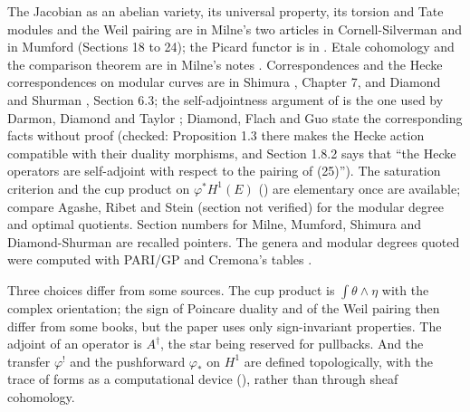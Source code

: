 The Jacobian as an abelian variety, its universal property, its torsion and Tate modules and the Weil pairing are in Milne's two articles in Cornell-Silverman
\cite{MilneJacobian86,MilneAbelian86} and in Mumford \cite{Mumford70} (Sections 18 to 24); the Picard functor is in \cite[Chapter 9]{BLR}. Etale cohomology and the comparison theorem are in
Milne's notes \cite{MilneEtale}. Correspondences and the Hecke correspondences on modular curves are in Shimura \cite{Shimura71}, Chapter 7, and Diamond and Shurman \cite{DiamondShurman}, Section 6.3;
the self-adjointness argument of  is the one used by Darmon, Diamond and Taylor \cite[Section 4.4]{DDT}; Diamond, Flach and Guo state the corresponding facts without
proof \cite[Sections 1.6.1 and 1.8.2]{DFG04} (checked: Proposition 1.3 there makes the Hecke action compatible with their duality morphisms, and Section 1.8.2 says that ``the Hecke
operators are self-adjoint with respect to the pairing of (25)''). The saturation criterion and the cup product on $\varphi^*H^1(E)$ () are elementary once
 are available; compare Agashe, Ribet and Stein \cite[Section 3]{ARS12} (section not verified) for the modular degree and optimal quotients.
Section numbers for Milne, Mumford, Shimura and Diamond-Shurman are recalled pointers. The genera and modular degrees quoted were computed with PARI/GP \cite{PARI} and Cremona's tables
\cite{Cremona97}.

Three choices differ from some sources. The cup product is $\int\theta\wedge\eta$ with the complex orientation; the sign of Poincare duality and of the Weil pairing then differ from some books, but the
paper uses only sign-invariant properties. The adjoint of an operator is $A^\dagger$, the star being reserved for pullbacks. And the transfer $\varphi^!$ and the pushforward $\varphi_*$ on $H^1$ are
defined topologically, with the trace of forms as a computational device (), rather than through sheaf cohomology.
